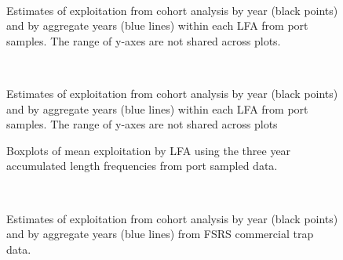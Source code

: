 \documentclass[11pt]{article}
\newcommand{\e}{/SpinDr/backup/bio_data/bio.lobster/figures/} %
\begin{document}
\begin{figure}
        \centering
         \\
                    
                    \caption{Estimates of exploitation from cohort analysis by year (black points) and by aggregate years (blue lines) within each LFA from port samples. The range of y-axes are not shared across plots.}
        \end{figure}

\begin{figure}
        \centering
         \\
                     \caption{Estimates of exploitation from cohort analysis by year (black points) and by aggregate years (blue lines) within each LFA from port samples. The range of y-axes are not shared across plots}
        \end{figure}


\begin{figure}
\centering
              \caption{Boxplots of mean exploitation by LFA using the three year accumulated length frequencies from port sampled data.}
\end{figure}

\begin{figure}
        \centering
         \\
                     \caption{Estimates of exploitation from cohort analysis by year (black points) and by aggregate years (blue lines) from FSRS commercial trap data.}
        \end{figure}
\end{document}
